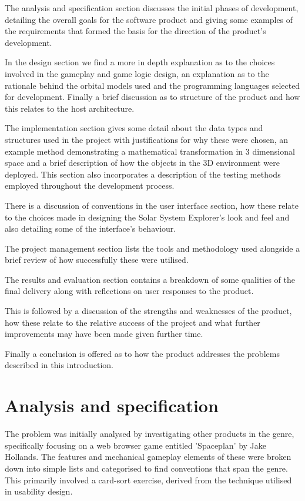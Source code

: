 \documentclass[twoside]{bhamthesis}
\begin{document}
\medskip
The analysis and specification section discusses the initial phases of development, detailing the overall goals for the software product and giving some examples of the requirements that formed the basis for the direction of the product's development.

\medskip
In the design section we find a more in depth explanation as to the choices involved in the gameplay and game logic design, an explanation as to the rationale behind the orbital models used and the programming languages selected for development. Finally a brief discussion as to structure of the product and how this relates to the host architecture.

\medskip
The implementation section gives some detail about the data types and structures used in the project with justifications for why these were chosen, an example method demonstrating a mathematical transformation in 3 dimensional space and a brief description of how the objects in the 3D environment were deployed. This section also incorporates a description of the testing methods employed throughout the development process.

\medskip
There is a discussion of conventions in the user interface section, how these relate to the choices made in designing the Solar System Explorer's look and feel and also detailing some of the interface's behaviour.

\medskip
The project management section lists the tools and methodology used alongside a brief review of how successfully these were utilised.

\medskip
The results and evaluation section contains a breakdown of some qualities of the final delivery along with reflections on user responses to the product.

\medskip
This is followed by a discussion of the strengths and weaknesses of the product, how these relate to the relative success of the project and what further improvements may have been made given further time.

\medskip
Finally a conclusion is offered as to how the product addresses the problems described in this introduction.

\section{Analysis and specification}

The problem was initially analysed by investigating other products in the genre, specifically focusing on a web browser game entitled 'Spaceplan' by Jake Hollands. The features and mechanical gameplay elements of these were broken down into simple lists and categorised to find conventions that span the genre. This primarily involved a card-sort exercise, derived from the technique utilised in usability design.
\end{document}
